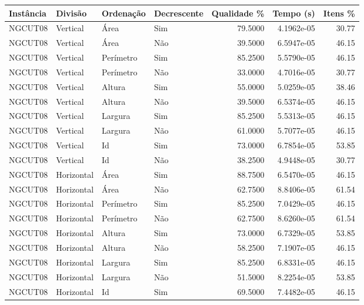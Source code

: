 \begin{tabular}{llllrrr}
\hline
Instância & Divisão     & Ordenação & Decrescente & Qualidade \% & Tempo (s)  & Itens \% \\
\hline
NGCUT08   & Vertical    & Área      & Sim         & 79.5000      & 4.1962e-05 & 30.77    \\
NGCUT08   & Vertical    & Área      & Não         & 39.5000      & 6.5947e-05 & 46.15    \\
NGCUT08   & Vertical    & Perímetro & Sim         & 85.2500      & 5.5790e-05 & 46.15    \\
NGCUT08   & Vertical    & Perímetro & Não         & 33.0000      & 4.7016e-05 & 30.77    \\
NGCUT08   & Vertical    & Altura    & Sim         & 55.0000      & 5.0259e-05 & 38.46    \\
NGCUT08   & Vertical    & Altura    & Não         & 39.5000      & 6.5374e-05 & 46.15    \\
NGCUT08   & Vertical    & Largura   & Sim         & 85.2500      & 5.5313e-05 & 46.15    \\
NGCUT08   & Vertical    & Largura   & Não         & 61.0000      & 5.7077e-05 & 46.15    \\
NGCUT08   & Vertical    & Id        & Sim         & 73.0000      & 6.7854e-05 & 53.85    \\
NGCUT08   & Vertical    & Id        & Não         & 38.2500      & 4.9448e-05 & 30.77    \\
NGCUT08   & Horizontal  & Área      & Sim         & 88.7500      & 6.5470e-05 & 46.15    \\
NGCUT08   & Horizontal  & Área      & Não         & 62.7500      & 8.8406e-05 & 61.54    \\
NGCUT08   & Horizontal  & Perímetro & Sim         & 85.2500      & 7.0429e-05 & 46.15    \\
NGCUT08   & Horizontal  & Perímetro & Não         & 62.7500      & 8.6260e-05 & 61.54    \\
NGCUT08   & Horizontal  & Altura    & Sim         & 73.0000      & 6.7329e-05 & 53.85    \\
NGCUT08   & Horizontal  & Altura    & Não         & 58.2500      & 7.1907e-05 & 46.15    \\
NGCUT08   & Horizontal  & Largura   & Sim         & 85.2500      & 6.8331e-05 & 46.15    \\
NGCUT08   & Horizontal  & Largura   & Não         & 51.5000      & 8.2254e-05 & 53.85    \\
NGCUT08   & Horizontal  & Id        & Sim         & 69.5000      & 7.4482e-05 & 46.15    \\

\end{tabular}
